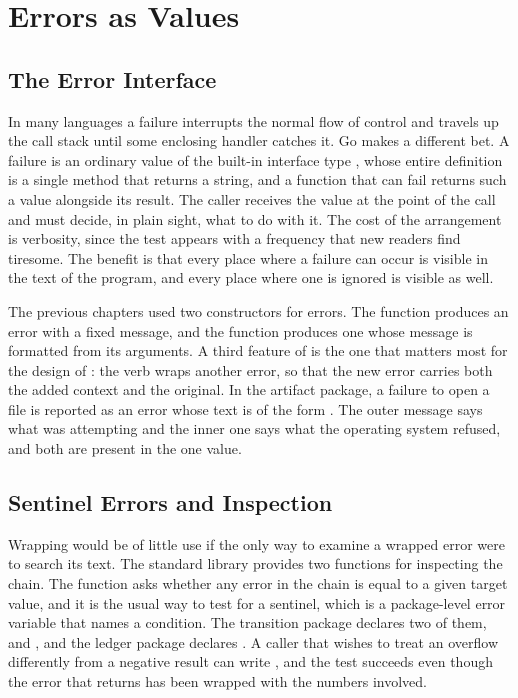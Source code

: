 \chapter{Errors as Values}
\label{ch:errors}

\section{The Error Interface}

In many languages a failure interrupts the normal flow of control and travels up the call stack until some enclosing handler catches it. Go makes a different bet. A failure is an ordinary value of the built-in interface type , whose entire definition is a single method that returns a string, and a function that can fail returns such a value alongside its result. The caller receives the value at the point of the call and must decide, in plain sight, what to do with it. The cost of the arrangement is verbosity, since the test  appears with a frequency that new readers find tiresome. The benefit is that every place where a failure can occur is visible in the text of the program, and every place where one is ignored is visible as well.

The previous chapters used two constructors for errors. The function  produces an error with a fixed message, and the function  produces one whose message is formatted from its arguments. A third feature of  is the one that matters most for the design of \golab{}: the verb  wraps another error, so that the new error carries both the added context and the original. In the artifact package, a failure to open a file is reported as an error whose text is of the form . The outer message says what \golab{} was attempting and the inner one says what the operating system refused, and both are present in the one value.

\section{Sentinel Errors and Inspection}

Wrapping would be of little use if the only way to examine a wrapped error were to search its text. The standard library provides two functions for inspecting the chain. The function  asks whether any error in the chain is equal to a given target value, and it is the usual way to test for a sentinel, which is a package-level error variable that names a condition. The transition package declares two of them,  and , and the ledger package declares . A caller that wishes to treat an overflow differently from a negative result can write , and the test succeeds even though the error that  returns has been wrapped with the numbers involved.

